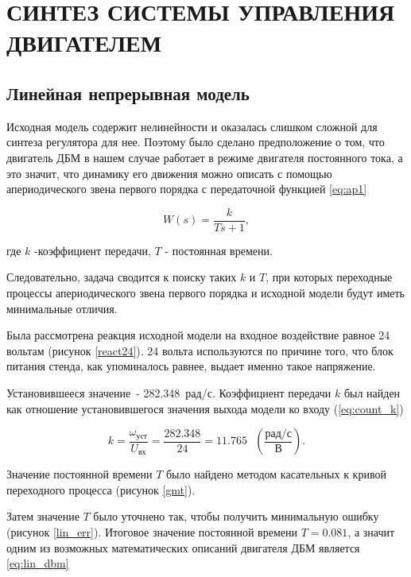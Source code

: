 \section{СИНТЕЗ СИСТЕМЫ УПРАВЛЕНИЯ ДВИГАТЕЛЕМ}

\subsection{Линейная непрерывная модель}

Исходная модель содержит нелинейности и оказалась слишком сложной для синтеза регулятора для нее.
Поэтому было сделано предположение о том, что двигатель ДБМ в нашем случае работает
в режиме двигателя постоянного тока, а это значит, что динамику его движения можно
описать с помощью апериодического звена первого порядка с передаточной функцией \ref{eq:ap1}

\begin{equation}
  W(s)=\frac{k}{Ts+1},
  \label{eq:ap1}
\end{equation}

где $k$ -коэффициент передачи, $T$ - постоянная времени.

Следовательно, задача сводится к поиску таких $k$ и $T$, при которых переходные процессы
апериодического звена первого порядка и исходной модели будут иметь минимальные отличия.


Была рассмотрена реакция исходной модели на входное воздействие равное 24 вольтам (рисунок \ref{react24}).
24 вольта используются по причине того, что блок питания стенда, как упоминалось равнее, выдает 
именно такое напряжение.

Установившееся значение~- 282.348~\mbox{рад/с}.
Коэффициент передачи $k$ был найден как отношение установившегося значения выхода модели ко входу (\ref{eq:count_k})

\begin{equation}
  k = \frac{\omega_{\text{уст}}}{U_{\text{вх}}} = \frac{282.348}{24} = 11.765\text{ }(\frac{\text{рад/с}}{\text{В}}).
  \label{eq:count_k}
\end{equation}

Значение постоянной времени $T$ было найдено методом касательных к кривой переходного
процесса (рисунок \ref{gmt}).


Затем значение $T$ было уточнено так, чтобы получить минимальную ошибку (рисунок \ref{lin_err}).
Итоговое значение постоянной времени $T = 0.081$, а значит одним из возможных
математических описаний двигателя ДБМ является \ref{eq:lin_dbm}

